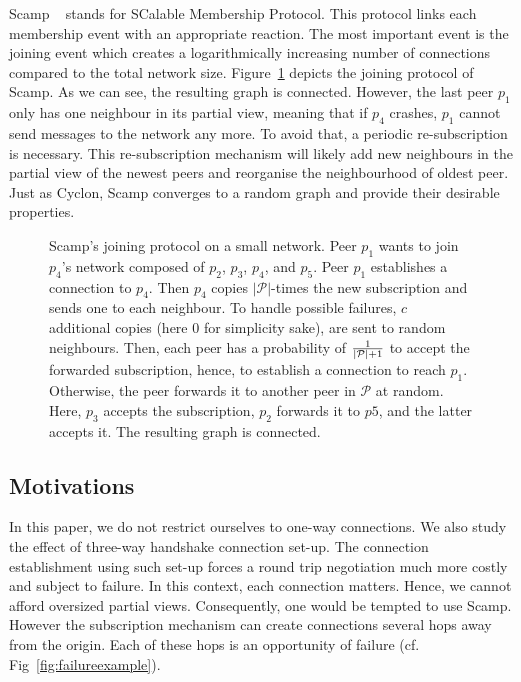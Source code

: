 \begin{asparadesc}
\item [Scamp]~\cite{ganesh2003peer} stands for SCalable Membership
  Protocol. This protocol links each membership event with an appropriate
  reaction.  The most important event is the joining event which creates a
  logarithmically increasing number of connections compared to the total
  network size.  Figure~\ref{fig:scampexample} depicts the joining protocol of
  Scamp. As we can see, the resulting graph is connected. However, the last
  peer $p_1$ only has one neighbour in its partial view, meaning that if $p_4$
  crashes, $p_1$ cannot send messages to the network any more. To avoid that, a
  periodic re-subscription is necessary. This re-subscription mechanism will
  likely add new neighbours in the partial view of the newest peers and
  reorganise the neighbourhood of oldest peer. Just as Cyclon, Scamp converges
  to a random graph and provide their desirable properties.
\end{asparadesc}

\begin{figure}
  \centering
  
  \caption{\label{fig:scampexample} Scamp's joining protocol on a small
    network. Peer $p_1$ wants to join $p_4$'s network composed of $p_2$,
    $p_3$, $p_4$, and $p_5$. Peer $p_1$ establishes a connection to $p_4$. Then
    $p_4$ copies $|\mathcal{P}|$-times the new subscription and sends one to
    each neighbour. To handle possible failures, $c$ additional copies (here
    $0$ for simplicity sake), are sent to random neighbours. Then, each peer
    has a probability of $1\over{|\mathcal{P}|+1}$ to accept the forwarded
    subscription, hence, to establish a connection to reach $p_1$. Otherwise,
    the peer forwards it to another peer in $\mathcal{P}$ at random. Here,
    $p_3$ accepts the subscription, $p_2$ forwards it to $p5$, and the latter
    accepts it. The resulting graph is connected.}
\end{figure}

\subsection{Motivations}
In this paper, we do not restrict ourselves to one-way connections. We also
study the effect of three-way handshake connection set-up. The connection
establishment using such set-up forces a round trip negotiation much more
costly and subject to failure. In this context, each connection matters. Hence,
we cannot afford oversized partial views. Consequently, one would be tempted to
use Scamp. However the subscription mechanism can create connections several
hops away from the origin. Each of these hops is an opportunity of failure
(cf. Fig~\ref{fig:failureexample}).

